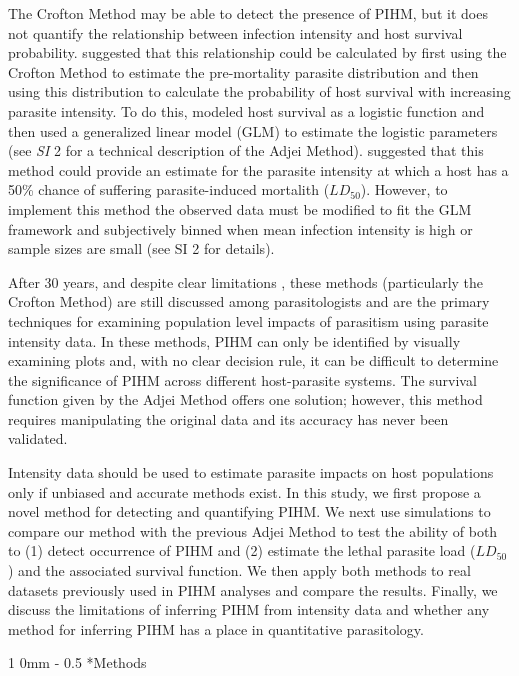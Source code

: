 \documentclass[12pt, a4paper]{article}
\makeatletter
\renewcommand{\section}{\@startsection
{section}%
{1}%
{0mm}%
{-\baselineskip}%
{0.5\baselineskip}%
{\normalfont\bf\large}} %
\makeatother
\begin{document}
The Crofton Method may be able to detect the presence of PIHM, but it does not quantify the relationship between infection intensity and host survival
probability. \cite{Adjei1986} suggested that this relationship
could be calculated by first using the Crofton Method to estimate the pre-mortality parasite distribution and then using this distribution to calculate the
probability of host survival with increasing parasite intensity. To do this,
\cite{Adjei1986} modeled host survival as a logistic function and then used a generalized linear model (GLM) to estimate the logistic parameters (see \emph{SI} 2 for a technical description of the Adjei Method).
\citeauthor{Adjei1986} suggested that this method could provide an estimate for the parasite intensity at which a host has a 50\% chance of suffering parasite-induced mortalith ($LD_{50}$). However, to implement this method the observed data must be
modified to fit the GLM framework and subjectively binned when mean
infection intensity is high or sample sizes are small (see SI 2 for details).

After 30 years, and despite clear limitations \citep{McCallum2000a}, these
methods (particularly the Crofton Method) are still discussed among
parasitologists and are the primary techniques for examining population level
impacts of parasitism using parasite intensity data. In these methods, PIHM can
only be identified by visually examining plots and, with no clear decision
rule, it can be difficult to determine the significance of PIHM across
different host-parasite systems. The survival function given by the Adjei
Method offers one solution; however, this method requires manipulating the
original data and its accuracy has never been validated.

Intensity data should
be used to estimate parasite impacts on host populations only if unbiased and accurate methods exist. In
this study, we first propose a novel method for detecting and quantifying PIHM. We
next use simulations to compare our method with the previous Adjei
Method to test the ability of both to (1) detect occurrence of PIHM and (2) estimate the
lethal parasite load ($LD_{50}$) and the associated survival function.  We then
apply both methods to real datasets previously used in PIHM analyses and
compare the results. Finally, we discuss the limitations of inferring PIHM
from intensity data and whether any method for inferring PIHM has a place
in quantitative parasitology.

\section*{Methods}
\end{document}
